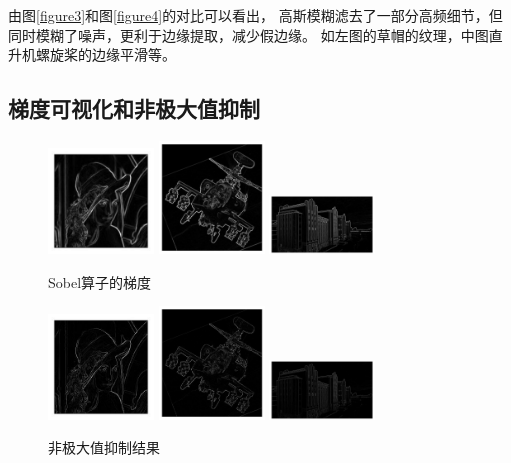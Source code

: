 \documentclass{article}
\begin{document}
    由图\ref{figure3}和图\ref{figure4}的对比可以看出，
    高斯模糊滤去了一部分高频细节，但同时模糊了噪声，更利于边缘提取，减少假边缘。
    如左图的草帽的纹理，中图直升机螺旋桨的边缘平滑等。

\subsection{梯度可视化和非极大值抑制}
\newpage

\begin{figure}[h]
    \centering
    \includegraphics[width=0.25\textwidth]{./sobel_gradmap/1}
    \includegraphics[width=0.25\textwidth]{./sobel_gradmap/2}
    \includegraphics[width=0.25\textwidth]{./sobel_gradmap/3}
    \caption{Sobel算子的梯度}
\end{figure}

\begin{figure}[h]
    \centering
    \includegraphics[width=0.25\textwidth]{./filter_notmax/1}
    \includegraphics[width=0.25\textwidth]{./filter_notmax/2}
    \includegraphics[width=0.25\textwidth]{./filter_notmax/3}
    \caption{非极大值抑制结果}
\end{figure}
\end{document}
